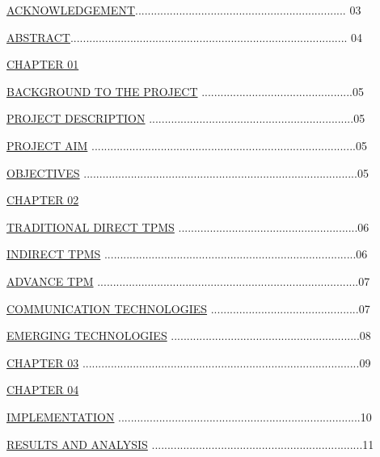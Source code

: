 \documentclass[
]{article}
\begin{document}
\protect\hyperlink{acknowledgement}{ACKNOWLEDGEMENT}................................................................... 03

\protect\hyperlink{key-words}{ABSTRACT}........................................................................................ 04

\protect\hyperlink{abstract}{CHAPTER 01}

\protect\hyperlink{background-to-the-project}{BACKGROUND TO THE PROJECT}
................................................05

\protect\hyperlink{project-description}{PROJECT DESCRIPTION} .................................................................05

\protect\hyperlink{project-aim}{PROJECT AIM} ....................................................................................05

\protect\hyperlink{_bookmark7}{OBJECTIVES} .......................................................................................05

\protect\hyperlink{_bookmark8}{CHAPTER 02}

\protect\hyperlink{traditional-direct-tpms}{TRADITIONAL DIRECT TPMS} .........................................................06

\protect\hyperlink{indirect-tpms}{INDIRECT TPMS} ................................................................................06

\protect\hyperlink{chapter-02}{ADVANCE TPM} ...................................................................................07

\protect\hyperlink{communication-technologies}{COMMUNICATION
TECHNOLOGIES} ...............................................07

\protect\hyperlink{advance-tpm}{EMERGING TECHNOLOGIES} ............................................................08

\protect\hyperlink{emerging-technologies}{CHAPTER 03} ........................................................................................09

\protect\hyperlink{_bookmark15}{CHAPTER 04}

\protect\hyperlink{implementation}{IMPLEMENTATION} .............................................................................10

\protect\hyperlink{results-and-analysis}{RESULTS AND ANALYSIS} ...................................................................11
\end{document}
